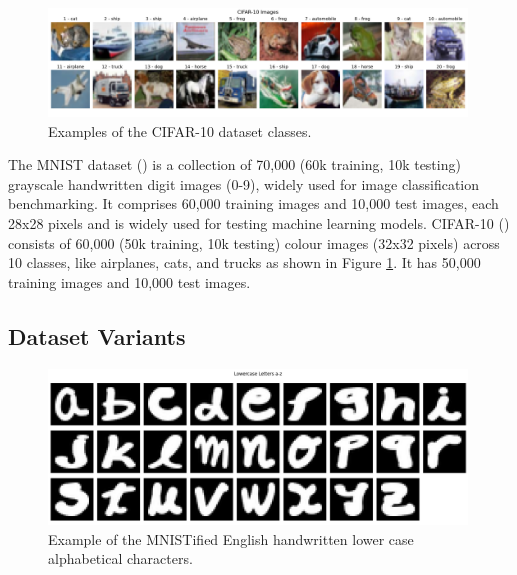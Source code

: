 \begin{figure}[h]
\centering
\includegraphics[width=0.99\textwidth]{Figures/Methods/CIFAR-10-Images-20imgs-2rows-10cols.png}
\caption{Examples of the CIFAR-10 dataset classes.}
\label{fig:Images-20imgs-2rows-10cols}
\end{figure}

The MNIST dataset (\cite{mnist}) is a collection of 70,000 (60k training, 10k testing) grayscale handwritten digit images (0-9), widely used for image classification benchmarking. It comprises 60,000 training images and 10,000 test images, each 28x28 pixels and is widely used for testing machine learning models. CIFAR-10 (\cite{cifar10}) consists of 60,000 (50k training, 10k testing) colour images (32x32 pixels) across 10 classes, like airplanes, cats, and trucks as shown in Figure \ref{fig:Images-20imgs-2rows-10cols}. It has 50,000 training images and 10,000 test images. 


\subsection{Dataset Variants}



\begin{figure}[h]
\centering
\includegraphics[width=0.99\textwidth]{Figures/Results/HandwrittenCharacters/mnistified-a-z.png}
\caption{Example of the MNISTified English handwritten lower case alphabetical characters.}
\label{fig:mnistified-a-z-methods}
\end{figure}

